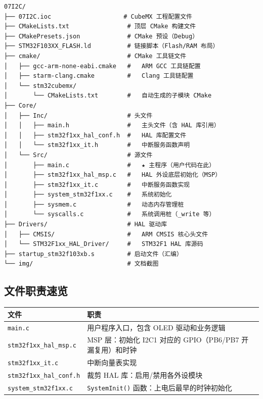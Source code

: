 \documentclass[
  chinese,
  UTF8,
  oneside,
  openany]{ctexbook}
\begin{document}
\begin{verbatim}
07I2C/
├── 07I2C.ioc                    # CubeMX 工程配置文件
├── CMakeLists.txt                # 顶层 CMake 构建文件
├── CMakePresets.json             # CMake 预设（Debug）
├── STM32F103XX_FLASH.ld          # 链接脚本（Flash/RAM 布局）
├── cmake/                        # CMake 工具链文件
│   ├── gcc-arm-none-eabi.cmake   #   ARM GCC 工具链配置
│   ├── starm-clang.cmake         #   Clang 工具链配置
│   └── stm32cubemx/
│       └── CMakeLists.txt        #   自动生成的子模块 CMake
├── Core/
│   ├── Inc/                      # 头文件
│   │   ├── main.h                #   主头文件（含 HAL 库引用）
│   │   ├── stm32f1xx_hal_conf.h  #   HAL 库配置文件
│   │   └── stm32f1xx_it.h        #   中断服务函数声明
│   └── Src/                      # 源文件
│       ├── main.c                #   ★ 主程序（用户代码在此）
│       ├── stm32f1xx_hal_msp.c   #   HAL 外设底层初始化（MSP）
│       ├── stm32f1xx_it.c        #   中断服务函数实现
│       ├── system_stm32f1xx.c    #   系统初始化
│       ├── sysmem.c              #   动态内存管理桩
│       └── syscalls.c            #   系统调用桩（_write 等）
├── Drivers/                      # HAL 驱动库
│   ├── CMSIS/                    #   ARM CMSIS 核心头文件
│   └── STM32F1xx_HAL_Driver/     #   STM32F1 HAL 库源码
├── startup_stm32f103xb.s         # 启动文件（汇编）
└── img/                          # 文档截图
\end{verbatim}

\subsection{文件职责速览}\label{ux6587ux4ef6ux804cux8d23ux901fux89c8-1}

\begin{longtable}[]{@{}
  >{\raggedright\arraybackslash}p{}
  >{\raggedright\arraybackslash}p{}@{}}
\toprule\noalign{}
\begin{minipage}[b]{\linewidth}\raggedright
文件
\end{minipage} & \begin{minipage}[b]{\linewidth}\raggedright
职责
\end{minipage} \\
\midrule\noalign{}
\endhead
\bottomrule\noalign{}
\endlastfoot
\texttt{main.c} & 用户程序入口，包含 OLED 驱动和业务逻辑 \\
\texttt{stm32f1xx\_hal\_msp.c} & MSP 层：初始化 I2C1 对应的
GPIO（PB6/PB7 开漏复用）和时钟 \\
\texttt{stm32f1xx\_it.c} & 中断向量表实现 \\
\texttt{stm32f1xx\_hal\_conf.h} & 裁剪 HAL 库：启用/禁用各外设模块 \\
\texttt{system\_stm32f1xx.c} & \texttt{SystemInit()}
函数：上电后最早的时钟初始化 \\
\end{longtable}
\end{document}
